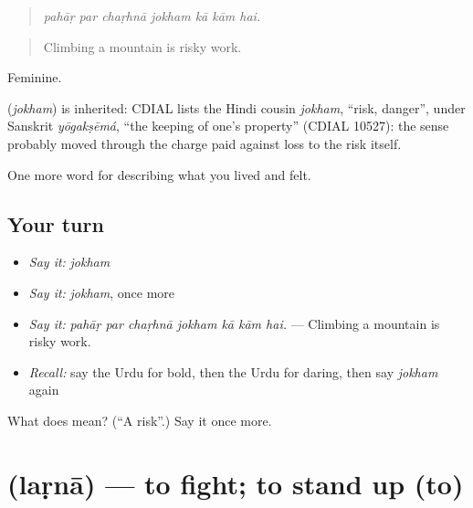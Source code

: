 \begin{quote}
      
\end{quote}

\begin{quote}
\emph{pahāṛ par chaṛhnā jokham kā kām hai.}
\end{quote}

\begin{quote}
Climbing a mountain is risky work.
\end{quote}

Feminine.

\begin{cousinweb}
\textbf{} (\emph{jokham}) is inherited: CDIAL lists the Hindi cousin \emph{jokham}, \textquotedblleft{}risk, danger\textquotedblright{}, under Sanskrit \emph{yōgakṣēmá}, \textquotedblleft{}the keeping of one's property\textquotedblright{} (CDIAL 10527): the sense probably moved through the charge paid against loss to the risk itself.
\end{cousinweb}

\begin{grammarlens}[title={What you've built}]
One more word for describing what you lived and felt.
\end{grammarlens}

\subsection*{Your turn}
\begin{itemize}
\raggedright
  \item \emph{Say it:} \emph{jokham}
  \item \emph{Say it:} \emph{jokham}, once more
  \item \emph{Say it:} \emph{pahāṛ par chaṛhnā jokham kā kām hai.} — Climbing a mountain is risky work.
  \item \emph{Recall:} say the Urdu for bold, then the Urdu for daring, then say \emph{jokham} again
\end{itemize}

\begin{tcolorbox}[breakable,colback=teal!4,colframe=teal!35!black,title={Before you move on}]
What does  mean? (\textquotedblleft{}A risk\textquotedblright{}.) Say it once more.
\end{tcolorbox}
\section[\texorpdfstring{\ur{لڑنا} (laṛnā)}{لڑنا (laṛnā)}]{ (laṛnā) — to fight; to stand up (to)}

